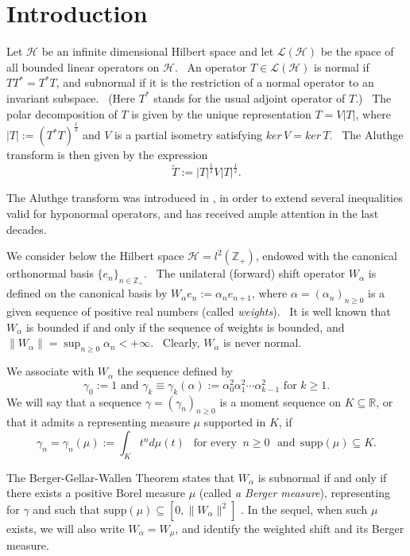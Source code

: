 \documentclass[12pt]{amsart}
\begin{document}
\section{Introduction}
Let $\mathcal{H}$ be an infinite dimensional  Hilbert space and let $\mathcal{L(H)}$ be the space of all bounded linear operators on $\mathcal{H}$. \ An operator  $T \in \mathcal{L(H)}$ is normal if $TT^*=T^*T$, and subnormal if it is the restriction of a normal operator to an invariant subspace. \ (Here $T^*$ stands for the usual adjoint operator of $T$.) \ The polar decomposition of $T$ is given by the unique representation $T= V|T|$, where $|T|:= (T^*T)^{\frac{1}{2}}$ and $V$ is a partial isometry satisfying $ker \, V = ker \, T$. \ The Aluthge transform is then given by the expression 
$$\tilde T:= |T|^{\frac{1}{2}}V|T |^{\frac{1}{2}}.$$

The Aluthge  transform was introduced in  \cite{al}, in
order to extend several inequalities valid for hyponormal operators, and has received ample attention in the last decades.

We consider below the Hilbert space $\mathcal{H}=l^2(\mathbb{Z}_+)$, endowed with the canonical orthonormal basis $\{e_n\}_{n\in\mathbb{Z}_+}$. \ The unilateral (forward) shift operator  $W_{\alpha}$  is defined on the canonical basis by $W_\alpha e_n:=\alpha_n e_{n+1}$, where  $\alpha=(\alpha_n)_{n\geq 0}$ is a given  sequence of positive real numbers (called {\it weights}). \ It is well known that $W_{\alpha}$ is bounded if and only if the sequence of weights is bounded, and  $\displaystyle\|W_{\alpha}\|=\sup_{n\geq0}\alpha_n<+\infty$. \ Clearly, $W_{\alpha}$ is never normal. \ 

\medskip
We associate with $W_\alpha$ the sequence defined by 
$$
\gamma_0:=1  \mbox{  and } \gamma_k\equiv\gamma_k(\alpha):=\alpha_0^2\alpha_1^2\cdots\alpha_{k-1}^2 \mbox{ for } k\geq 1.
$$ 
We will say that a sequence $\gamma=(\gamma_n)_{n\geq0}$ is a moment sequence on $K\subseteq {\mathbb R}$, or that it admits a representing measure $\mu$ supported in $K$,  if 
\begin{equation}\label{cmp}
	\gamma_n = \gamma_n(\mu):= \int_Kt^nd\mu(t)\: \: \mbox{ for every } \: n\ge 0 \:\: \: \mbox{and} \: \: \mathrm{supp}(\mu) \subseteq K.
\end{equation}

 The Berger-Gellar-Wallen Theorem states that  $W_{\alpha}$ is subnormal if and only if there exists a positive Borel measure $\mu$ (called {\it a Berger measure}), representing for $\gamma$ and such that $\mathrm{supp}(\mu)\subseteq[0,\|W_{\alpha}\|^2]$ \cite[III.8.16]{Con}.  In the sequel, when such $\mu$ exists, we will also write $W_{\alpha}=W_{\mu}$, and identify the weighted shift and its Berger measure.
\end{document}
